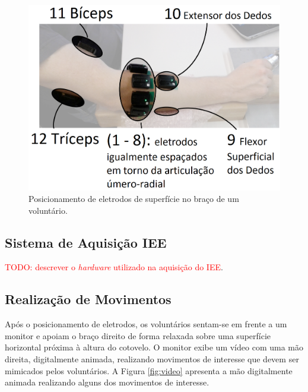 \begin{figure}[htb]
	\caption{\label{fig:eletrodos}Posicionamento de eletrodos de superfície no braço de um voluntário.}
	\begin{center}
	    \includegraphics[width=0.75\linewidth]{./img/eletrodos.png}
	\end{center}
\end{figure}

			\subsection{Sistema de Aquisição IEE}
\textcolor{red}{TODO: descrever o \emph{hardware} utilizado na aquisição do IEE}.

			\subsection{Realização de Movimentos}
Após o posicionamento de eletrodos, os voluntários sentam-se em frente a um monitor e apoiam o braço direito de forma relaxada sobre uma superfície horizontal próxima à altura do cotovelo. O monitor exibe um vídeo com uma mão direita, digitalmente animada, realizando movimentos de interesse que devem ser mimicados pelos voluntários. A Figura \ref{fig:video} apresenta a mão digitalmente animada realizando alguns dos movimentos de interesse.

